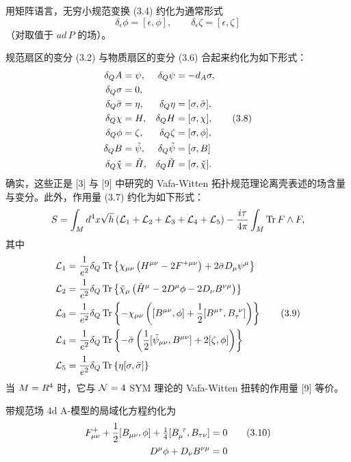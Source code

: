 用矩阵语言，无穷小规范变换 (3.4) 约化为通常形式
\[
  \delta_\epsilon\phi=[\epsilon,\phi],\qquad \delta_\epsilon\zeta=[\epsilon,\zeta]
\]
（对取值于 $\mathit{ad}\,P$ 的场）。

规范扇区的变分 (3.2) 与物质扇区的变分 (3.6) 合起来约化为如下形式：
\begin{align}
  \delta_QA &= \psi, & \delta_Q\psi &= -d_A\sigma, \notag\\
  \delta_Q\sigma &= 0, \notag\\
  \delta_Q\bar\sigma &= \eta, & \delta_Q\eta &= [\sigma,\bar\sigma], \notag\\
  \delta_Q\chi &= H, & \delta_QH &= [\sigma,\chi], \tag{3.8}\\
  \delta_Q\phi &= \zeta, & \delta_Q\zeta &= [\sigma,\phi], \notag\\
  \delta_QB &= \tilde\psi, & \delta_Q\tilde\psi &= [\sigma,B] \notag\\
  \delta_Q\tilde\chi &= \tilde H, & \delta_Q\tilde H &= [\sigma,\tilde\chi]. \notag
\end{align}
确实，这些正是 [3] 与 [9] 中研究的 Vafa-Witten 拓扑规范理论离壳表述的场含量与变分。此外，作用量 (3.7) 约化为如下形式：
\[
  S=\int_Md^4x\sqrt{h}\left(\mathcal{L}_1+\mathcal{L}_2+\mathcal{L}_3+\mathcal{L}_4+\mathcal{L}_5\right)-\frac{i\tau}{4\pi}\int_M\operatorname{Tr} F\wedge F,
\]
其中
\begin{align}
  \mathcal{L}_1 &= \frac{1}{e^2}\delta_Q\Tr\left\{\chi_{\mu\nu}\left(H^{\mu\nu}-2F^{+\mu\nu}\right)+2\bar\sigma D_\mu\psi^\mu\right\} \notag\\
  \mathcal{L}_2 &= \frac{1}{e^2}\delta_Q\Tr\left\{\tilde\chi_\mu\left(\tilde H^\mu-2D^\mu\phi-2D_\nu B^{\nu\mu}\right)\right\} \notag\\
  \mathcal{L}_3 &= \frac{1}{e^2}\delta_Q\Tr\left\{-\chi_{\mu\nu}\left([B^{\mu\nu},\phi]+\frac12[B^{\mu\tau},B_\tau^{\ \nu}]\right)\right\} \tag{3.9}\\
  \mathcal{L}_4 &= \frac{1}{e^2}\delta_Q\Tr\left\{-\bar\sigma\left(\frac12[\tilde\psi_{\mu\nu},B^{\mu\nu}]+2[\zeta,\phi]\right)\right\} \notag\\
  \mathcal{L}_5 &= \frac{1}{e^2}\delta_Q\Tr\left\{\eta[\sigma,\bar\sigma]\right\} \notag
\end{align}
当 $M=R^4$ 时，它与 $\mathcal{N}=4$ SYM 理论的 Vafa-Witten 扭转的作用量 [9] 等价。

带规范场 4d A-模型的局域化方程约化为
\begin{align}
  F^+_{\mu\nu}+\frac12[B_{\mu\nu},\phi]+\tfrac14[B_\mu^{\ \tau},B_{\tau\nu}] &= 0 \tag{3.10}\\
  D^\mu\phi+D_\nu B^{\nu\mu} &= 0 \notag
\end{align}

